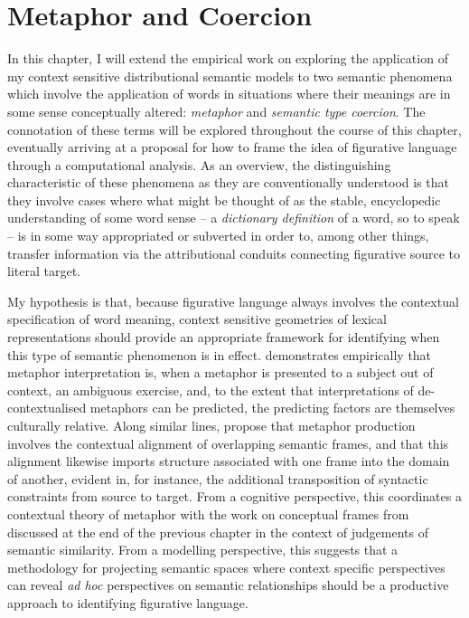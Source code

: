 \chapter{Metaphor and Coercion} \label{chap:figurative}
In this chapter, I will extend the empirical work on exploring the application of my context sensitive distributional semantic models to two semantic phenomena which involve the application of words in situations where their meanings are in some sense conceptually altered: \emph{metaphor} and \emph{semantic type coercion}.  The connotation of these terms will be explored throughout the course of this chapter, eventually arriving at a proposal for how to frame the idea of figurative language through a computational analysis.  As an overview, the distinguishing characteristic of these phenomena as they are conventionally understood is that they involve cases where what might be thought of as the stable, encyclopedic understanding of some word sense -- a \emph{dictionary definition} of a word, so to speak -- is in some way appropriated or subverted in order to, among other things, transfer information via the attributional conduits connecting figurative source to literal target.

My hypothesis is that, because figurative language always involves the contextual specification of word meaning, context sensitive geometries of lexical representations should provide an appropriate framework for identifying when this type of semantic phenomenon is in effect.  \cite{Fraser1993} demonstrates empirically that metaphor interpretation is, when a metaphor is presented to a subject out of context, an ambiguous exercise, and, to the extent that interpretations of de-contextualised metaphors can be predicted, the predicting factors are themselves culturally relative.  Along similar lines, \cite{BouveretEA2009} propose that metaphor production involves the contextual alignment of overlapping semantic frames, and that this alignment likewise imports structure associated with one frame into the domain of another, evident in, for instance, the additional transposition of syntactic constraints from source to target.  From a cognitive perspective, this coordinates a contextual theory of metaphor with the work on conceptual frames from \cite{Barsalou1992} discussed at the end of the previous chapter in the context of judgements of semantic similarity.  From a modelling perspective, this suggests that a methodology for projecting semantic spaces where context specific perspectives can reveal \emph{ad hoc} perspectives on semantic relationships should be a productive approach to identifying figurative language.

